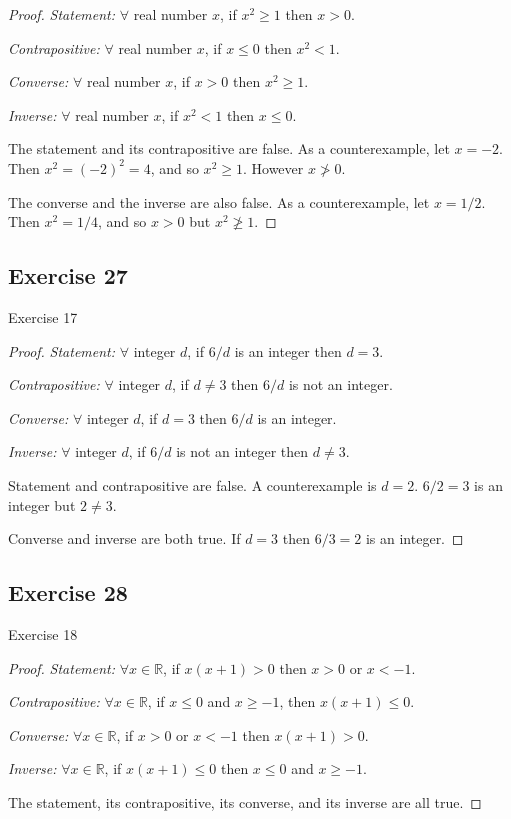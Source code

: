 \documentclass[14pt]{extarticle}
\newcommand{\R}{\mathbb{R}}
\newcommand{\fa}{\forall}
\begin{document}
\begin{proof}
    {\it Statement:} $\fa$ real number $x$, if $x^2 \geq 1$ then $x > 0$.

        {\it Contrapositive:} $\fa$ real number $x$, if $x \leq 0$ then $x^2 < 1$.

        {\it Converse:} $\fa$ real number $x$, if $x > 0$ then $x^2 \geq 1$.

        {\it Inverse:} $\fa$ real number $x$, if $x^2 < 1$ then $x \leq 0$.

    The statement and its contrapositive are false. As a
    counterexample, let $x = -2$. Then $x^2 = (-2)^2 = 4$, and
    so $x^2 \geq 1$. However $x \ngtr 0$.

    The converse and the inverse are also false. As a counterexample, let $x = 1/2$. Then $x^2 = 1/4$, and so $x > 0$ but $x^2 \ngeq 1$.
\end{proof}

\subsection{Exercise 27}
Exercise 17

\begin{proof}
    {\it Statement:} $\fa$ integer $d$, if $6 / d$ is an integer then $d = 3$.

        {\it Contrapositive:} $\fa$ integer $d$, if $d \neq 3$ then $6 / d$ is not an integer.

        {\it Converse:} $\fa$ integer $d$, if $d = 3$ then $6 / d$ is an integer.

        {\it Inverse:} $\fa$ integer $d$, if $6 / d$ is not an integer then $d \neq 3$.

    Statement and contrapositive are false. A counterexample is $d = 2$. $6 / 2 = 3$ is an integer but $2 \neq 3$.

    Converse and inverse are both true. If $d = 3$ then $6 / 3 = 2$ is an integer.
\end{proof}

\subsection{Exercise 28}
Exercise 18

\begin{proof}
    {\it Statement:} $\fa x \in \R$, if $x(x + 1) > 0$ then $x > 0$ or $x < -1$.

        {\it Contrapositive:} $\fa x \in \R$, if $x \leq 0$ and $x \geq -1$, then $x(x + 1) \leq 0$.

        {\it Converse:} $\fa x \in \R$, if $x > 0$ or $x < -1$ then $x(x + 1) > 0$.

        {\it Inverse:} $\fa x \in \R$, if $x(x + 1) \leq 0$ then $x \leq 0$ and $x \geq -1$.

    The statement, its contrapositive, its converse, and its
    inverse are all true.
\end{proof}
\end{document}
